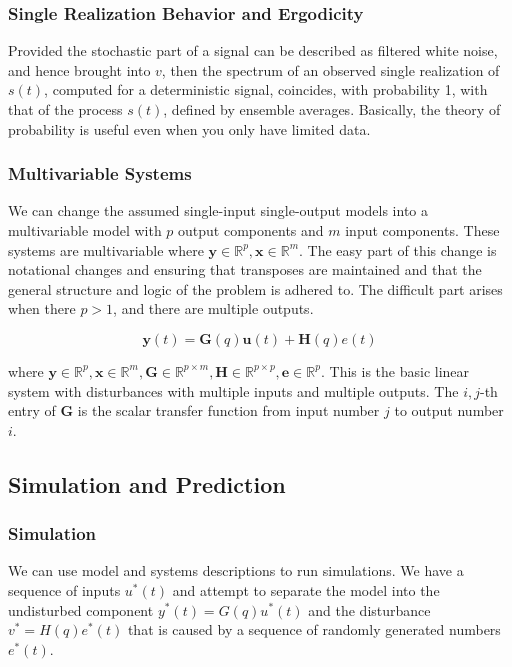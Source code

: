 \subsubsection{Single Realization Behavior and Ergodicity}
Provided the stochastic part of a signal can be described as filtered white noise, and hence brought into $v$, then the spectrum of an observed single realization of $s(t)$, computed for a deterministic signal, coincides, with probability 1, with that of the process $s(t)$, defined by ensemble averages.
Basically, the theory of probability is useful even when you only have limited data.

\subsubsection{Multivariable Systems}
We can change the assumed single-input single-output models into a multivariable model with $p$ output components and $m$ input components.
These systems are multivariable where $\mathbf{y} \in \mathbb{R}^p, \mathbf{x} \in \mathbb{R}^m$.
The easy part of this change is notational changes and ensuring that transposes are maintained and that the general structure and logic of the problem is adhered to.
The difficult part arises when there $p > 1$, and there are multiple outputs.

\begin{equation}
    \mathbf{y}(t) = \textbf{G} (q) \textbf{u}(t) + \textbf{H}(q) e(t)
\end{equation}

where $\mathbf{y} \in \mathbb{R}^p, \mathbf{x} \in \mathbb{R}^m, \textbf{G} \in \mathbb{R}^{p \times m}, \textbf{H} \in \mathbb{R}^{p \times p}, \textbf{e} \in \mathbb{R}^p$.
This is the basic linear system with disturbances with multiple inputs and multiple outputs.
The $i,j$-th entry of $\textbf{G}$ is the scalar transfer function from input number $j$ to output number $i$.

\subsection{Simulation and Prediction}
\subsubsection{Simulation}
We can use model and systems descriptions to run simulations.
We have a sequence of inputs $u^*(t)$ and attempt to separate the model into the undisturbed component $y^*(t) = G(q) u^*(t)$ and the disturbance $v^* = H(q) e^*(t)$ that is caused by a sequence of randomly generated numbers $e^*(t)$.

